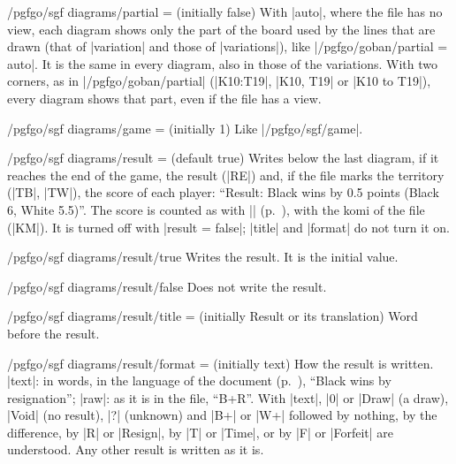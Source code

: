 \begin{key}{/pgfgo/sgf diagrams/partial =  (initially false)}
	With |auto|, where the file has no view, each diagram shows only the part of the board used by the lines that are drawn (that of |variation| and those of |variations|), like |/pgfgo/goban/partial = auto|. It is the same in every diagram, also in those of the variations. With two corners, as in |/pgfgo/goban/partial| (|K10:T19|, |{K10, T19}| or |{K10 to T19}|), every diagram shows that part, even if the file has a view.

	\begin{codeexample}
	\end{codeexample}
\end{key}

\begin{key}{/pgfgo/sgf diagrams/game =  (initially 1)}
	Like |/pgfgo/sgf/game|.
\end{key}

\begin{key}{/pgfgo/sgf diagrams/result =  (default true)}
	Writes below the last diagram, if it reaches the end of the game, the result (|RE|) and, if the file marks the territory (|TB|, |TW|), the score of each player: ``Result: Black wins by 0.5 points (Black 6, White 5.5)''. The score is counted as with |\pgfgoscore| (p.~\pageref{subsec:territorio}), with the komi of the file (|KM|). It is turned off with |result = false|; |title| and |format| do not turn it on.
\end{key}

\begin{stylekey}{/pgfgo/sgf diagrams/result/true}
	Writes the result. It is the initial value.
\end{stylekey}

\begin{stylekey}{/pgfgo/sgf diagrams/result/false}
	Does not write the result.
\end{stylekey}

\begin{key}{/pgfgo/sgf diagrams/result/title =  (initially Result or its translation)}
	Word before the result.
\end{key}

\begin{key}{/pgfgo/sgf diagrams/result/format =  (initially text)}
	How the result is written. |text|: in words, in the language of the document (p.~\pageref{subsec:idiomas}), ``Black wins by resignation''; |raw|: as it is in the file, ``B+R''. With |text|, |0| or |Draw| (a draw), |Void| (no result), |?| (unknown) and |B+| or |W+| followed by nothing, by the difference, by |R| or |Resign|, by |T| or |Time|, or by |F| or |Forfeit| are understood. Any other result is written as it is.
\end{key}

